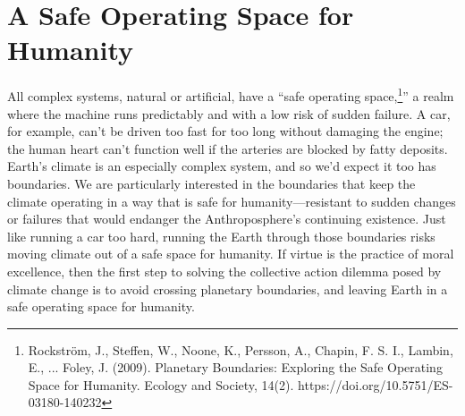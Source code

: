 
\section{A Safe Operating Space for Humanity} \label{Humanities Safe Place}
All complex systems, natural or artificial, have a ``safe operating space,\footnote{Rockstr\"{o}m, J., Steffen, W., Noone, K., Persson, A., Chapin, F. S. I., Lambin, E., ... Foley, J. (2009). Planetary Boundaries: Exploring the Safe Operating Space for Humanity. Ecology and Society, 14(2). https://doi.org/10.5751/ES-03180-140232}'' a realm where the machine runs predictably and with a low risk of sudden failure. A car, for example, can't be driven too fast for too long without damaging the engine; the human heart can't function well if the arteries are blocked by fatty deposits. Earth's climate is an especially complex system, and so we'd expect it too has boundaries. We are particularly interested in the boundaries that keep the climate operating in a way that is safe for humanity---resistant to sudden changes or failures that would endanger the Anthroposphere's continuing existence. Just like running a car too hard, running the Earth through those boundaries risks moving climate out of a safe space for humanity. If virtue is the practice of moral excellence, then the first step to solving the collective action dilemma posed by climate change is to avoid crossing planetary boundaries, and leaving Earth in a safe operating space for humanity.
 
